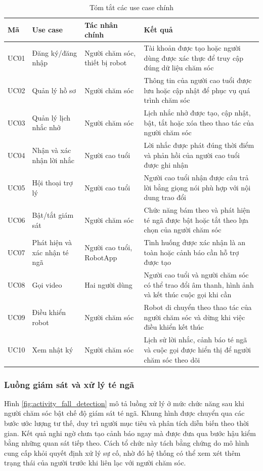 \begin{table}[htbp]
\centering
\caption{Tóm tắt các use case chính}
\label{tab:usecases}
\small
\begin{tabularx}{\textwidth}{|p{1.3cm}|p{4.0cm}|p{3.0cm}|X|}
\hline
\textbf{Mã} & \textbf{Use case} & \textbf{Tác nhân chính} & \textbf{Kết quả} \\
\hline
UC01 & Đăng ký/đăng nhập & Người chăm sóc, thiết bị robot & Tài khoản được tạo hoặc người dùng được xác thực để truy cập đúng dữ liệu chăm sóc \\
\hline
UC02 & Quản lý hồ sơ & Người chăm sóc & Thông tin của người cao tuổi được lưu hoặc cập nhật để phục vụ quá trình chăm sóc \\
\hline
UC03 & Quản lý lịch nhắc nhở & Người chăm sóc & Lịch nhắc nhở được tạo, cập nhật, bật, tắt hoặc xóa theo thao tác của người chăm sóc \\
\hline
UC04 & Nhận và xác nhận lời nhắc & Người cao tuổi & Lời nhắc được phát đúng thời điểm và phản hồi của người cao tuổi được ghi nhận \\
\hline
UC05 & Hội thoại trợ lý & Người cao tuổi & Người cao tuổi nhận được câu trả lời bằng giọng nói phù hợp với nội dung trao đổi \\
\hline
UC06 & Bật/tắt giám sát & Người chăm sóc & Chức năng bám theo và phát hiện té ngã được bật hoặc tắt theo lựa chọn của người chăm sóc \\
\hline
UC07 & Phát hiện và xác nhận té ngã & Người cao tuổi, RobotApp & Tình huống được xác nhận là an toàn hoặc cảnh báo cần hỗ trợ được tạo \\
\hline
UC08 & Gọi video & Hai người dùng & Người cao tuổi và người chăm sóc có thể trao đổi âm thanh, hình ảnh và kết thúc cuộc gọi khi cần \\
\hline
UC09 & Điều khiển robot & Người chăm sóc & Robot di chuyển theo thao tác của người chăm sóc và dừng khi việc điều khiển kết thúc \\
\hline
UC10 & Xem nhật ký & Người chăm sóc & Lịch sử lời nhắc, cảnh báo té ngã và cuộc gọi được hiển thị để người chăm sóc theo dõi \\
\hline
\end{tabularx}
\end{table}

\clearpage
\subsubsection{Luồng giám sát và xử lý té ngã}

Hình \ref{fig:activity_fall_detection} mô tả luồng xử lý ở mức chức năng sau khi người chăm sóc bật chế độ giám sát té ngã. Khung hình được chuyển qua các bước ước lượng tư thế, duy trì người mục tiêu và phân tích diễn biến theo thời gian. Kết quả nghi ngờ chưa tạo cảnh báo ngay mà được đưa qua bước hậu kiểm bằng những quan sát tiếp theo. Cách tổ chức này tách bằng chứng do mô hình cung cấp khỏi quyết định xử lý sự cố, nhờ đó hệ thống có thể xem xét thêm trạng thái của người trước khi liên lạc với người chăm sóc.


